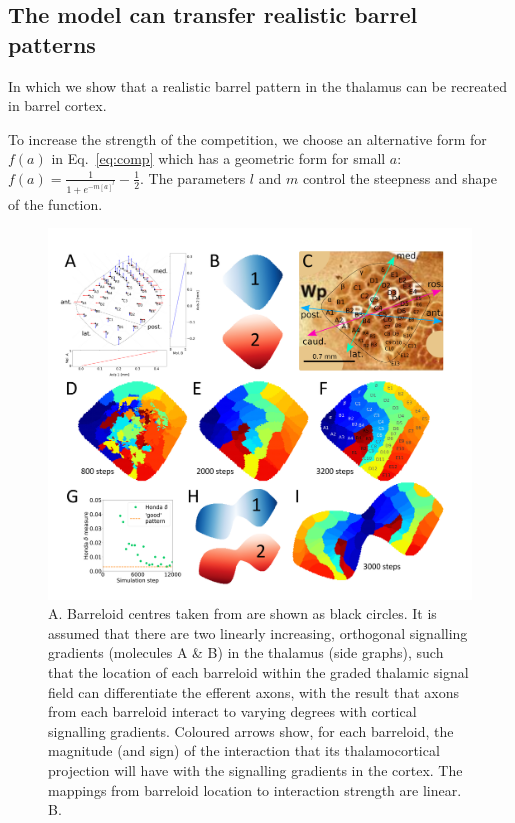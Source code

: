 \documentclass[9pt,twocolumn,twoside,lineno]{pnas-new}
\begin{document}
\subsection*{The model can transfer realistic barrel patterns}

In which we show that a realistic barrel pattern in the thalamus can be
recreated in barrel cortex.


To increase the strength of the competition, we choose an alternative form for
$f(a)$ in Eq.~\ref{eq:comp} which has a geometric form for small $a$: $f(a) = \frac{1}{1 + e^{-m[a]^l}} - \frac{1}{2}$. The parameters $l$ and $m$ control the steepness and shape of the
function.


\begin{figure}
\begin{center}
\includegraphics[width=\textwidth]{./MainFig.png}
\end{center}
\caption{A. Barreloid centres taken from \cite{haidarliu_size_2001} are shown as
  black circles. It is assumed that there are two linearly increasing,
  orthogonal signalling gradients (molecules A \& B) in the thalamus (side
  graphs), such that the location of each barreloid within the graded thalamic
  signal field can differentiate the efferent axons, with the result that
  axons from each barreloid interact to varying degrees with cortical
  signalling gradients. Coloured arrows show, for each barreloid, the
  magnitude (and sign) of the interaction that its thalamocortical projection
  will have with the signalling gradients in the cortex. The mappings from
  barreloid location to interaction strength are linear. B. }
\label{fig:main}
\end{figure}
\end{document}

